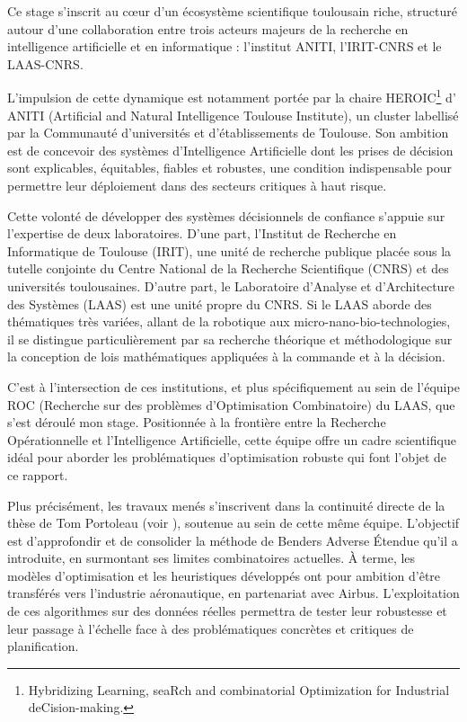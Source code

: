 \documentclass[12pt, a4paper, twoside]{report}
\numberwithin{equation}{section}
\begin{document}
	Ce stage s'inscrit au cœur d'un écosystème scientifique toulousain riche, structuré autour d'une collaboration entre trois acteurs majeurs de la recherche en intelligence artificielle et en informatique : l'institut ANITI, l'IRIT-CNRS et le LAAS-CNRS.
	
	L'impulsion de cette dynamique est notamment portée par la chaire HEROIC\footnote{Hybridizing Learning, seaRch and combinatorial Optimization for Industrial deCision-making.} d' ANITI (Artificial and Natural Intelligence Toulouse Institute), un cluster labellisé par la Communauté d'universités et d'établissements de Toulouse. Son ambition est de concevoir des systèmes d'Intelligence Artificielle dont les prises de décision sont explicables, équitables, fiables et robustes, une condition indispensable pour permettre leur déploiement dans des secteurs critiques à haut risque.
	
	Cette volonté de développer des systèmes décisionnels de confiance s'appuie sur l'expertise de deux laboratoires. D'une part, l'Institut de Recherche en Informatique de Toulouse (IRIT), une unité de recherche publique placée sous la tutelle conjointe du Centre National de la Recherche Scientifique (CNRS) et des universités toulousaines. D'autre part, le Laboratoire d'Analyse et d'Architecture des Systèmes (LAAS) est une unité propre du CNRS. Si le LAAS aborde des thématiques très variées, allant de la robotique aux micro-nano-bio-technologies, il se distingue particulièrement par sa recherche théorique et méthodologique sur la conception de lois mathématiques appliquées à la commande et à la décision.
	
	C'est à l'intersection de ces institutions, et plus spécifiquement au sein de l'équipe ROC (Recherche sur des problèmes d'Optimisation Combinatoire) du LAAS, que s'est déroulé mon stage. Positionnée à la frontière entre la Recherche Opérationnelle et l'Intelligence Artificielle, cette équipe offre un cadre scientifique idéal pour aborder les problématiques d'optimisation robuste qui font l'objet de ce rapport.

    Plus précisément, les travaux menés s'inscrivent dans la continuité directe de la thèse de Tom Portoleau (voir \cite{portoleauTHESIS}), soutenue au sein de cette même équipe. L'objectif est d'approfondir et de consolider la méthode de Benders Adverse Étendue qu'il a introduite, en surmontant ses limites combinatoires actuelles. À terme, les modèles d'optimisation et les heuristiques développés ont pour ambition d'être transférés vers l'industrie aéronautique, en partenariat avec Airbus. L'exploitation de ces algorithmes sur des données réelles permettra de tester leur robustesse et leur passage à l'échelle face à des problématiques concrètes et critiques de planification.
	
\end{document}
